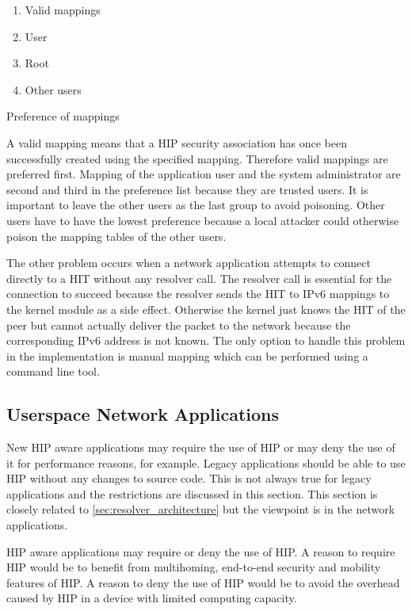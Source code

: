 \begin{table}[htb]
\begin{enumerate}
\item Valid mappings
\item User
\item Root
\item Other users
\end{enumerate}
\caption{Preference of mappings}
\label{tbl:preference_of_mappings}
\end{table}

A valid mapping means that a HIP security association has once been
successfully created using the specified mapping. Therefore valid
mappings are preferred first. Mapping of the application user and the
system administrator are second and third in the preference list
because they are trusted users. It is important to leave the other
users as the last group to avoid poisoning. Other users have to have
the lowest preference because a local attacker could otherwise poison
the mapping tables of the other users.

The other problem occurs when a network application attempts to
connect directly to a HIT without any resolver call. The resolver call
is essential for the connection to succeed because the resolver sends
the HIT to IPv6 mappings to the kernel module as a side
effect. Otherwise the kernel just knows the HIT of the peer but cannot
actually deliver the packet to the network because the corresponding
IPv6 address is not known. The only option to handle this problem in
the implementation is manual mapping which can be performed using a
command line tool.

\subsection{Userspace Network Applications}
\label{sec:application_architecture}

New HIP aware applications may require the use of HIP or may deny the
use of it for performance reasons, for example. Legacy applications
should be able to use HIP without any changes to source code. This is
not always true for legacy applications and the restrictions are
discussed in this section. This section is closely related to
\autoref{sec:resolver_architecture} but the viewpoint is in the
network applications.

HIP aware applications may require or deny the use of HIP. A reason to
require HIP would be to benefit from multihoming, end-to-end security
and mobility features of HIP. A reason to deny the use of HIP would be
to avoid the overhead caused by HIP in a device with limited computing
capacity.

